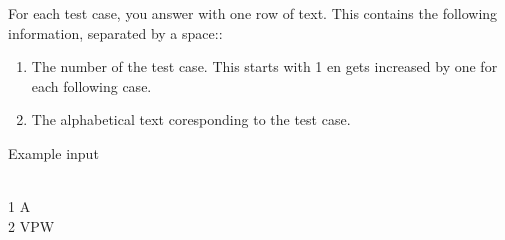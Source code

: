 \documentclass[10pt,a4paper]{article}
\begin{document}
For each test case, you answer with one row of text. This contains the following information, separated by a space::
\begin{enumerate}
	\item The number of the test case. This starts with 1 en gets increased by one for each following case.
	\item The alphabetical text coresponding to the test case.
\end{enumerate}


\begin{center}
Example input
\end{center}
\mbox{} \\
1 A \\
2 VPW
\end{document}
